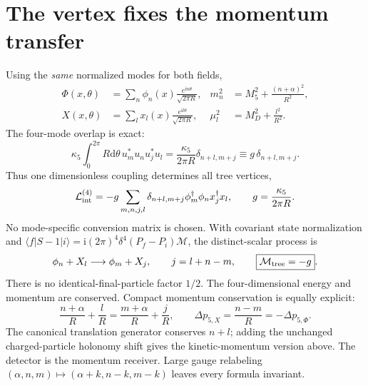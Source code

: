 \documentclass[11pt,a4paper]{article}
\newcommand{\dd}{\mathrm d}
\newcommand{\ii}{\mathrm i}
\newcommand{\cM}{\mathcal M}
\newcommand{\cL}{\mathcal L}
\begin{document}
\section{The vertex fixes the momentum transfer}
Using the \emph{same} normalized modes for both fields,
\begin{align}
 \Phi(x,\theta)&=\sum_n\phi_n(x)\frac{e^{\ii n\theta}}{\sqrt{2\pi R}},
 &m_n^2&=M_5^2+\frac{(n+\alpha)^2}{R^2},\\
 X(x,\theta)&=\sum_l x_l(x)\frac{e^{\ii l\theta}}{\sqrt{2\pi R}},
 &\mu_l^2&=M_D^2+\frac{l^2}{R^2}.
\end{align}
The four-mode overlap is exact:
\begin{equation}
 \kappa_5\int_0^{2\pi}R\dd\theta\,
 u_m^*u_nu_j^*u_l
 =\frac{\kappa_5}{2\pi R}\delta_{n+l,m+j}
 \equiv g\,\delta_{n+l,m+j}.
\end{equation}
Thus one dimensionless coupling determines all tree vertices,
\begin{equation}\label{eq:vertex}
 \cL_{\rm int}^{(4)}
 =-g\sum_{m,n,j,l}\delta_{n+l,m+j}
       \phi_m^\dagger\phi_n x_j^\dagger x_l,\qquad
 g=\frac{\kappa_5}{2\pi R}.
\end{equation}
No mode-specific conversion matrix is chosen.
With covariant state normalization and
$\langle f|S-1|i\rangle=\ii(2\pi)^4\delta^4(P_f-P_i)\cM$,
the distinct-scalar process is
\begin{equation}\label{eq:process}
 \phi_n+X_l\longrightarrow\phi_m+X_j,\qquad
 j=l+n-m,\qquad \boxed{\cM_{\rm tree}=-g}.
\end{equation}
There is no identical-final-particle factor $1/2$.
The four-dimensional energy and momentum are conserved. Compact
momentum conservation is equally explicit:
\begin{equation}
 \frac{n+\alpha}{R}+\frac lR
 =\frac{m+\alpha}{R}+\frac jR,\qquad
 \Delta p_{5,X}=\frac{n-m}{R}=-\Delta p_{5,\Phi}.
\end{equation}
The canonical translation generator conserves $n+l$; adding the
unchanged charged-particle holonomy shift gives the kinetic-momentum
version above. The detector is the momentum receiver.
Large gauge relabeling
$(\alpha,n,m)\mapsto(\alpha+k,n-k,m-k)$ leaves every formula invariant.
\end{document}
